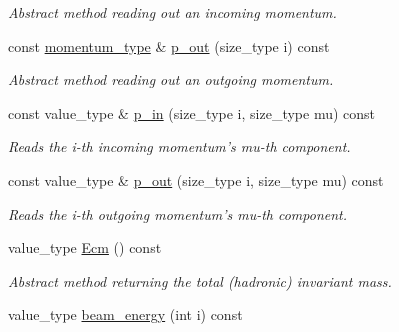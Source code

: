 \begin{DoxyCompactItemize}
\begin{DoxyCompactList}\small\item\em Abstract method reading out an incoming momentum. \end{DoxyCompactList}\item 
\hypertarget{a00529_a1814975d91cf8557553b0c7837efa701}{const \hyperlink{a00559}{momentum\-\_\-type} \& \hyperlink{a00529_a1814975d91cf8557553b0c7837efa701}{p\-\_\-out} (size\-\_\-type i) const }\label{a00529_a1814975d91cf8557553b0c7837efa701}

\begin{DoxyCompactList}\small\item\em Abstract method reading out an outgoing momentum. \end{DoxyCompactList}\item 
\hypertarget{a00529_abd55d011bd1512b10f7b177dee803119}{const value\-\_\-type \& \hyperlink{a00529_abd55d011bd1512b10f7b177dee803119}{p\-\_\-in} (size\-\_\-type i, size\-\_\-type mu) const }\label{a00529_abd55d011bd1512b10f7b177dee803119}

\begin{DoxyCompactList}\small\item\em Reads the i-\/th incoming momentum's mu-\/th component. \end{DoxyCompactList}\item 
\hypertarget{a00529_a4a86879a5dafe541b12a6cd133464e41}{const value\-\_\-type \& \hyperlink{a00529_a4a86879a5dafe541b12a6cd133464e41}{p\-\_\-out} (size\-\_\-type i, size\-\_\-type mu) const }\label{a00529_a4a86879a5dafe541b12a6cd133464e41}

\begin{DoxyCompactList}\small\item\em Reads the i-\/th outgoing momentum's mu-\/th component. \end{DoxyCompactList}\item 
\hypertarget{a00529_af4ff8d535dd9b820e6937032b6f7ecff}{value\-\_\-type \hyperlink{a00529_af4ff8d535dd9b820e6937032b6f7ecff}{Ecm} () const }\label{a00529_af4ff8d535dd9b820e6937032b6f7ecff}

\begin{DoxyCompactList}\small\item\em Abstract method returning the total (hadronic) invariant mass. \end{DoxyCompactList}\item 
\hypertarget{a00529_a314adb09433282620cc5e2071f218c06}{value\-\_\-type \hyperlink{a00529_a314adb09433282620cc5e2071f218c06}{beam\-\_\-energy} (int i) const }\label{a00529_a314adb09433282620cc5e2071f218c06}


\end{DoxyCompactItemize}
